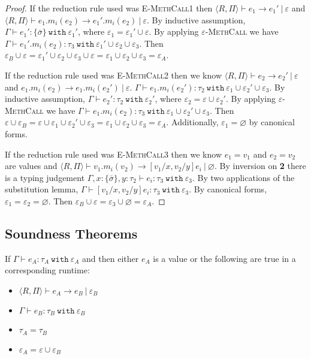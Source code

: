 \documentclass[a4paper,UKenglish]{lipics-v2016}
\newcommand{\kw}[1]{\mathtt{ #1 }~}
\newcommand{\rctx}[0]{ \langle R, \Pi \rangle }
\begin{document}
\begin{proof}
\noindent
If the reduction rule used was \textsc{E-MethCall1} then $\rctx \vdash e_1 \longrightarrow e_1'~|~\varepsilon$ and $\rctx \vdash e_1.m_i(e_2) \longrightarrow e_1'.m_i(e_2)~|~\varepsilon$. By inductive assumption, $\Gamma \vdash e_1': \{ \bar \sigma \}~\kw{with} \varepsilon_1'$, where $\varepsilon_1 = \varepsilon_1' \cup \varepsilon$. By applying \textsc{$\varepsilon$-MethCall} we have $\Gamma \vdash e_1'.m_i(e_2): \tau_3~\kw{with} \varepsilon_1' \cup \varepsilon_2 \cup \varepsilon_3$. Then $\varepsilon_B \cup \varepsilon = \varepsilon_1' \cup \varepsilon_2 \cup \varepsilon_3 \cup \varepsilon = \varepsilon_1 \cup \varepsilon_2 \cup \varepsilon_3 = \varepsilon_A$.

If the reduction rule used was \textsc{E-MethCall2} then we know $\rctx \vdash e_2 \longrightarrow e_2'~|~\varepsilon$ and $e_1.m_i(e_2) \longrightarrow e_1.m_i(e_2')~|~\varepsilon$. $\Gamma \vdash e_1.m_i(e_2'): \tau_2~\kw{with} \varepsilon_1 \cup \varepsilon_2' \cup \varepsilon_3$. By inductive assumption, $\Gamma \vdash e_2': \tau_2~\kw{with} \varepsilon_2'$, where $\varepsilon_2 = \varepsilon \cup \varepsilon_2'$. By applying \textsc{$\varepsilon$-MethCall} we have $\Gamma \vdash e_1.m_i(e_2): \tau_3~\kw{with} \varepsilon_1 \cup \varepsilon_2' \cup \varepsilon_3$. Then $\varepsilon \cup \varepsilon_B = \varepsilon \cup \varepsilon_1 \cup \varepsilon_2' \cup \varepsilon_3 = \varepsilon_1 \cup \varepsilon_2 \cup \varepsilon_3 = \varepsilon_A$. Additionally, $\varepsilon_1 = \varnothing$ by canonical forms.

If the reduction rule used was \textsc{E-MethCall3} then we know $e_1 = v_1$ and $e_2 = v_2$ are values and $\rctx \vdash v_1.m_i(v_2) \longrightarrow [v_1/x, v_2/y]e_i~|~\varnothing$. By inversion on \textbf{2} there is a typing judgement $\Gamma, x: \{ \bar \sigma \}, y: \tau_2 \vdash e_i: \tau_3~\kw{with} \varepsilon_3$. By two applications of the substitution lemma, $\Gamma \vdash [v_1/x, v_2/y]e_i: \tau_3~\kw{with} \varepsilon_3$. By canonical forms, $\varepsilon_1 = \varepsilon_2 = \varnothing$. Then $\varepsilon_B \cup \varepsilon = \varepsilon_3 \cup \varnothing = \varepsilon_A$.
\end{proof}

\subsection{Soundness Theorems}

\begin{theorem}
If $\Gamma \vdash e_A: \tau_A~\kw{with} \varepsilon_A$ and then either $e_A$ is a value or the following are true in a corresponding runtime:
\begin{itemize}
	\item $\rctx \vdash e_A \longrightarrow e_B~|~\varepsilon_B$
	\item $\Gamma \vdash e_B: \tau_B~\kw{with} \varepsilon_B$
	\item $\tau_A = \tau_B$
	\item $\varepsilon_A = \varepsilon \cup \varepsilon_B$
\end{itemize}

\end{theorem}
\end{document}
